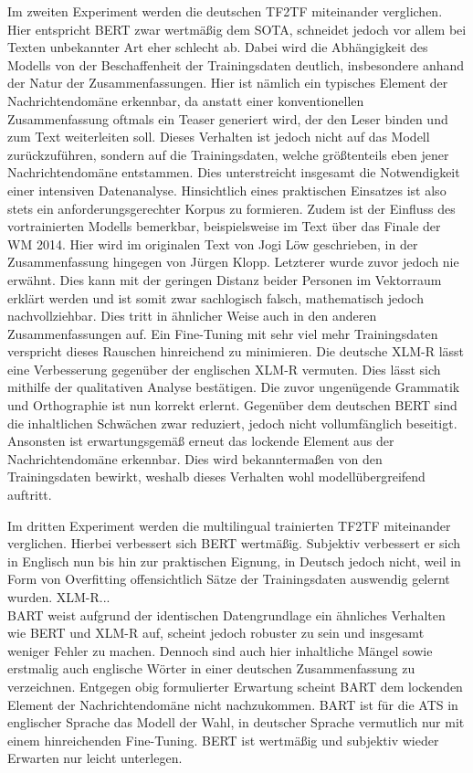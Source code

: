 \noindent
Im zweiten Experiment werden die deutschen \ac{TF2TF} miteinander verglichen. Hier entspricht \ac{BERT} zwar wertmäßig dem \ac{SOTA}, schneidet jedoch vor allem bei Texten unbekannter Art eher schlecht ab. Dabei wird die Abhängigkeit des Modells von der Beschaffenheit der Trainingsdaten deutlich, insbesondere anhand der Natur der Zusammenfassungen. Hier ist nämlich ein typisches Element der Nachrichtendomäne erkennbar, da anstatt einer konventionellen Zusammenfassung oftmals ein Teaser generiert wird, der den Leser binden und zum Text weiterleiten soll. Dieses Verhalten ist jedoch nicht auf das Modell zurückzuführen, sondern auf die Trainingsdaten, welche größtenteils eben jener Nachrichtendomäne entstammen. Dies unterstreicht insgesamt die Notwendigkeit einer intensiven Datenanalyse. Hinsichtlich eines praktischen Einsatzes ist also stets ein anforderungsgerechter Korpus zu formieren. Zudem ist der Einfluss des vortrainierten Modells bemerkbar, beispielsweise im Text über das Finale der WM 2014. Hier wird im originalen Text von Jogi Löw geschrieben, in der Zusammenfassung hingegen von Jürgen Klopp. Letzterer wurde zuvor jedoch nie erwähnt. Dies kann mit der geringen Distanz beider Personen im Vektorraum erklärt werden und ist somit zwar sachlogisch falsch, mathematisch jedoch nachvollziehbar. Dies tritt in ähnlicher Weise auch in den anderen Zusammenfassungen auf. Ein Fine-Tuning mit sehr viel mehr Trainingsdaten verspricht dieses Rauschen hinreichend zu minimieren. Die deutsche \ac{XLM-R} lässt eine Verbesserung gegenüber der englischen \ac{XLM-R} vermuten. Dies lässt sich mithilfe der qualitativen Analyse bestätigen. Die zuvor ungenügende Grammatik und Orthographie ist nun korrekt erlernt. Gegenüber dem deutschen \ac{BERT} sind die inhaltlichen Schwächen zwar reduziert, jedoch nicht vollumfänglich beseitigt. Ansonsten ist erwartungsgemäß erneut das lockende Element aus der Nachrichtendomäne erkennbar. Dies wird bekanntermaßen von den Trainingsdaten bewirkt, weshalb dieses Verhalten wohl modellübergreifend auftritt.
\newpage

\noindent
Im dritten Experiment werden die multilingual trainierten \ac{TF2TF} miteinander verglichen. Hierbei verbessert sich \ac{BERT} wertmäßig. Subjektiv verbessert er sich in Englisch nun bis hin zur praktischen Eignung, in Deutsch jedoch nicht, weil in Form von Overfitting offensichtlich Sätze der Trainingsdaten auswendig gelernt wurden. \ac{XLM-R}...\\ %
\ac{BART} weist aufgrund der identischen Datengrundlage ein ähnliches Verhalten wie \ac{BERT} und \ac{XLM-R} auf, scheint jedoch robuster zu sein und insgesamt weniger Fehler zu machen. Dennoch sind auch hier inhaltliche Mängel sowie erstmalig auch englische Wörter in einer deutschen Zusammenfassung zu verzeichnen. Entgegen obig formulierter Erwartung scheint \ac{BART} dem lockenden Element der Nachrichtendomäne nicht nachzukommen. \ac{BART} ist für die \ac{ATS} in englischer Sprache das Modell der Wahl, in deutscher Sprache vermutlich nur mit einem hinreichenden Fine-Tuning. \ac{BERT} ist wertmäßig und subjektiv wieder Erwarten nur leicht unterlegen.

